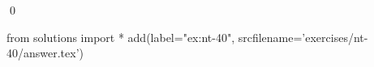 
\begin{ex} 
  \label{ex:nt-40}
  
  \qed
\end{ex} 
\begin{python0}
from solutions import *
add(label="ex:nt-40",
    srcfilename='exercises/nt-40/answer.tex') 
\end{python0}
